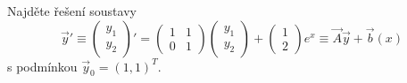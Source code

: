 \begin{ex}
   Najděte řešení soustavy
   \[
      \vec{y}'\equiv
      \begin{pmatrix}
         y_1\\y_2
      \end{pmatrix}'
      =
      \begin{pmatrix}
         1 & 1 \\ 0 & 1
      \end{pmatrix}
      \begin{pmatrix}
         y_1\\y_2
      \end{pmatrix}
      +
      \begin{pmatrix}
         1 \\ 2
      \end{pmatrix}
      e^{x}
      \equiv \vec{A}\vec{y}+\vec{b}(x)
   \]
   s podmínkou $\vec{y}_0=(1,1)^T$.
\end{ex}
